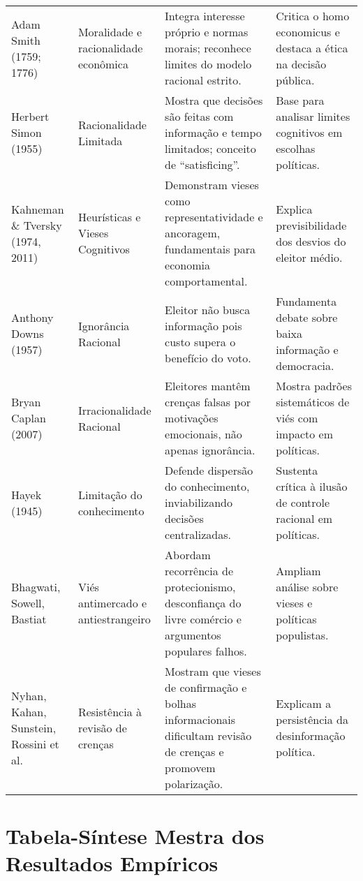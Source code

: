 \begin{apendicesenv}
\begin{quadro}[htbp]
\begin{longtable}{p{} p{} p{} p{}}
Adam Smith (1759; 1776) & Moralidade e racionalidade econômica & Integra interesse próprio e normas morais; reconhece limites do modelo racional estrito. & Critica o homo economicus e destaca a ética na decisão pública. \\
Herbert Simon (1955) & Racionalidade Limitada & Mostra que decisões são feitas com informação e tempo limitados; conceito de “satisficing”. & Base para analisar limites cognitivos em escolhas políticas. \\
Kahneman \& Tversky (1974, 2011) & Heurísticas e Vieses Cognitivos & Demonstram vieses como representatividade e ancoragem, fundamentais para economia comportamental. & Explica previsibilidade dos desvios do eleitor médio. \\
Anthony Downs (1957) & Ignorância Racional & Eleitor não busca informação pois custo supera o benefício do voto. & Fundamenta debate sobre baixa informação e democracia. \\
Bryan Caplan (2007) & Irracionalidade Racional & Eleitores mantêm crenças falsas por motivações emocionais, não apenas ignorância. & Mostra padrões sistemáticos de viés com impacto em políticas. \\
Hayek (1945) & Limitação do conhecimento & Defende dispersão do conhecimento, inviabilizando decisões centralizadas. & Sustenta crítica à ilusão de controle racional em políticas. \\
Bhagwati, Sowell, Bastiat & Viés antimercado e antiestrangeiro & Abordam recorrência de protecionismo, desconfiança do livre comércio e argumentos populares falhos. & Ampliam análise sobre vieses e políticas populistas. \\
Nyhan, Kahan, Sunstein, Rossini et al. & Resistência à revisão de crenças & Mostram que vieses de confirmação e bolhas informacionais dificultam revisão de crenças e promovem polarização. & Explicam a persistência da desinformação política. \\
\bottomrule
\end{longtable}
\end{quadro}

\chapter{Tabela-Síntese Mestra dos Resultados Empíricos}
\label{apendice:tabela_sintese}

\begin{landscape}
\begingroup
\scriptsize
\setlength{\tabcolsep}{3.5pt}


\end{landscape}
\end{apendicesenv}
